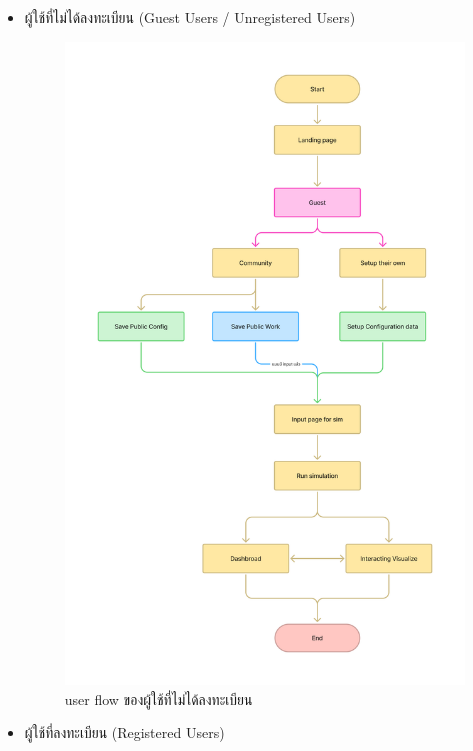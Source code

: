 \begin{mypara}

\begin{itemize}
    \item ผู้ใช้ที่ไม่ได้ลงทะเบียน (Guest Users / Unregistered Users)
    \begin{figure}[H]
    \centering
    \includegraphics[width=\textwidth,height=0.9\textheight,keepaspectratio]{User_flow_-_guest.png}
    \caption{user flow  ของผู้ใช้ที่ไม่ได้ลงทะเบียน}
    \label{fig:UserFlowUnregistered}
    \end{figure}
    \newpage
    \item ผู้ใช้ที่ลงทะเบียน (Registered Users)
    \begin{figure}[H]

\end{figure}
\end{itemize}
\end{mypara}
